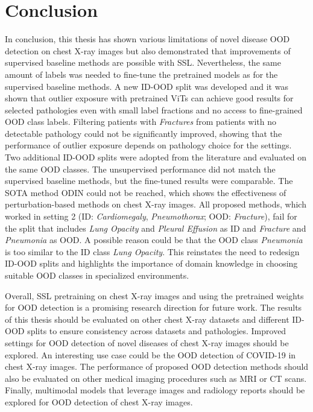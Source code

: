 \section{Conclusion}
In conclusion, this thesis has shown various limitations of novel disease OOD detection on chest X-ray images but also demonstrated that improvements of supervised baseline methods are possible with SSL. 
Nevertheless, the same amount of labels was needed to fine-tune the pretrained models as for the supervised baseline methods.
A new ID-OOD split was developed and it was shown that outlier exposure with pretrained ViTs can achieve good results for selected pathologies even with small label fractions and no access to fine-grained OOD class labels.
Filtering patients with \textit{Fractures} from patients with no detectable pathology could not be significantly improved, showing that the performance of outlier exposure depends on pathology choice for the settings.
Two additional ID-OOD splits were adopted from the literature and evaluated on the same OOD classes.
The unsupervised performance did not match the supervised baseline methods, but the fine-tuned results were comparable.
The SOTA method ODIN could not be reached, which shows the effectiveness of perturbation-based methods on chest X-ray images.
All proposed methods, which worked in setting 2 (ID: \textit{Cardiomegaly}, \textit{Pneumothorax}; OOD: \textit{Fracture}), fail for the split that includes \textit{Lung Opacity} and \textit{Pleural Effusion} as ID and \textit{Fracture} and \textit{Pneumonia} as OOD.
A possible reason could be that the OOD class \textit{Pneumonia} is too similar to the ID class \textit{Lung Opacity}.
This reinstates the need to redesign ID-OOD splits and highlights the importance of domain knowledge in choosing suitable OOD classes in specialized environments.
\par 
Overall, SSL pretraining on chest X-ray images and using the pretrained weights for OOD detection is a promising research direction for future work.
The results of this thesis should be evaluated on other chest X-ray datasets and different ID-OOD splits to ensure consistency across datasets and pathologies.
Improved settings for OOD detection of novel diseases of chest X-ray images should be explored.
An interesting use case could be the OOD detection of COVID-19 in chest X-ray images.
The performance of proposed OOD detection methods should also be evaluated on other medical imaging procedures such as MRI or CT scans.
Finally, multimodal models that leverage images and radiology reports should be explored for OOD detection of chest X-ray images.